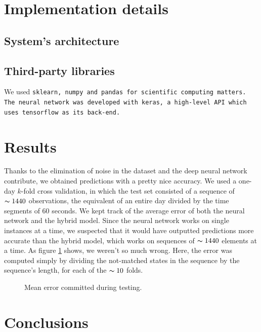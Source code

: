 \documentclass[10pt,a4paper]{article}
\begin{document}
\section{Implementation details}
\subsection{System's architecture}
\subsection{Third-party libraries}
We used \tt sklearn\rm, \tt numpy \rm and \tt pandas \rm for scientific computing matters. The neural network was developed with \tt keras\rm, a high-level API which uses \tt tensorflow \rm as its back-end. 
\section{Results}
Thanks to the elimination of noise in the dataset and the deep neural network contribute, we obtained predictions with a pretty nice accuracy. We used a one-day $k$-fold cross validation, in which the test set consisted of a sequence of $\thicksim 1440$ observations, the equivalent of an entire day divided by the time segments of $60$ seconds. We kept track of the average error of  both the neural network and the hybrid model. Since the neural network works on single instances at a time, we suspected that it would have outputted predictions more accurate than the hybrid model, which works on sequences of $\thicksim 1440$ elements at a time. As figure \ref{figure:err_graph} shows, we weren't so much wrong. Here, the error was computed simply by dividing the not-matched states in the sequence by the sequence's length, for each of the $\thicksim 10$ folds.

\begin{figure}
	\centering
	\caption{Mean error committed during testing.}
	\label{figure:err_graph}
\end{figure}
\section{Conclusions}
\end{document}
